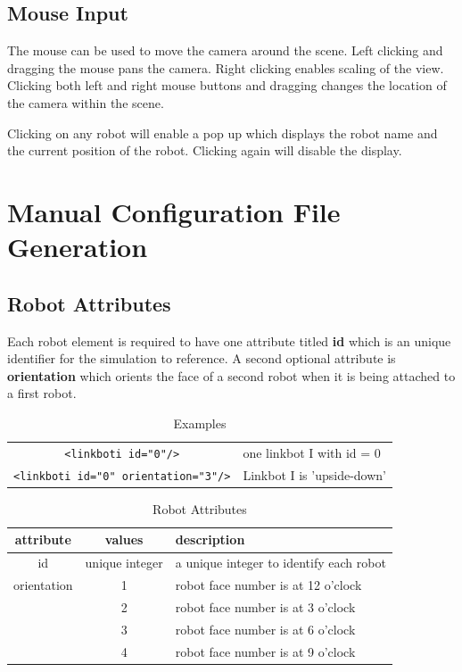 \documentclass{article}
\begin{document}
\subsection{Mouse Input}
The mouse can be used to move the camera around the scene.  Left clicking and
dragging the mouse pans the camera.  Right clicking enables scaling of the view.
Clicking both left and right mouse buttons and dragging changes the location of
the camera within the scene.

Clicking on any robot will enable a pop up which displays the robot name and the
current position of the robot.  Clicking again will disable the display.

\appendix
\section{Manual Configuration File Generation}
\subsection{Robot Attributes}
Each robot element is required to have one attribute titled \textbf{id} which is
an unique identifier for the simulation to reference.  A second optional
attribute is \textbf{orientation} which orients the face of a second robot when
it is being attached to a first robot.

\begin{table}[H]
	\begin{center}
	\begin{tabular}{c | l}
		\hline 
		\verb|<linkboti id="0"/>| & one linkbot I with id = 0 \\
		\verb|<linkboti id="0" orientation="3"/>| & Linkbot I is 'upside-down' \\
		\hline
	\end{tabular}
	\caption{Examples}
	\label{tab:ex}
	\end{center}
\end{table}

\begin{table}[H]
	\begin{center}
	\begin{tabular}{c | c | l}
		\hline \hline
		\textbf{attribute} & \textbf{values} & \textbf{description} \\ \hline
		id & unique integer & a unique integer to identify each robot \\
		orientation & 1 & robot face number is at 12 o'clock \\
		 & 2 & robot face number is at 3 o'clock \\
		 & 3 & robot face number is at 6 o'clock \\
		 & 4 & robot face number is at 9 o'clock \\
		\hline \hline
	\end{tabular}
	\caption{Robot Attributes}
	\label{tab:attributes}
	\end{center}
\end{table}
\end{document}
